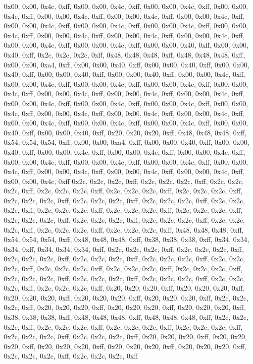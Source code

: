 0x00, 0x00, 0x4c, 0xff, 0x00, 0x00, 0x4c, 0xff, 0x00, 0x00, 0x4c, 0xff, 0x00, 0x00, 0x4c, 0xff, 0x00, 0x00, 0x4c, 0xff, 0x00, 0x00, 0x4c, 0xff, 0x00, 0x00, 0x4c, 0xff, 0x00, 0x00, 0x4c, 0xff, 0x00, 0x00, 0x4c, 0xff, 0x00, 0x00, 0x4c, 0xff, 0x00, 0x00, 0x4c, 0xff, 0x00, 0x00, 0x4c, 0xff, 0x00, 0x00, 0x4c, 0xff, 0x00, 0x00, 0x4c, 0xff, 0x00, 0x00, 0x4c, 0xff, 0x00, 0x00, 0x4c, 0xff, 0x00, 0x00, 0x40, 0xff, 0x00, 0x00, 0x40, 0xff, 0x2c, 0x2c, 0x2c, 0xff, 0x48, 0x48, 0x48, 0xff, 0x48, 0x48, 0x48, 0xff, 0x00, 0x00, 0xa4, 0xff, 0x00, 0x00, 0x40, 0xff, 0x00, 0x00, 0x40, 0xff, 0x00, 0x00, 0x40, 0xff, 0x00, 0x00, 0x40, 0xff, 0x00, 0x00, 0x40, 0xff, 0x00, 0x00, 0x4c, 0xff, 0x00, 0x00, 0x4c, 0xff, 0x00, 0x00, 0x4c, 0xff, 0x00, 0x00, 0x4c, 0xff, 0x00, 0x00, 0x4c, 0xff, 0x00, 0x00, 0x4c, 0xff, 0x00, 0x00, 0x4c, 0xff, 0x00, 0x00, 0x4c, 0xff, 0x00, 0x00, 0x4c, 0xff, 0x00, 0x00, 0x4c, 0xff, 0x00, 0x00, 0x4c, 0xff, 0x00, 0x00, 0x4c, 0xff, 0x00, 0x00, 0x4c, 0xff, 0x00, 0x00, 0x4c, 0xff, 0x00, 0x00, 0x4c, 0xff, 0x00, 0x00, 0x4c, 0xff, 0x00, 0x00, 0x4c, 0xff, 0x00, 0x00, 0x4c, 0xff, 0x00, 0x00, 0x40, 0xff, 0x00, 0x00, 0x40, 0xff, 0x20, 0x20, 0x20, 0xff, 0x48, 0x48, 0x48, 0xff, 0x54, 0x54, 0x54, 0xff, 0x00, 0x00, 0xa4, 0xff, 0x00, 0x00, 0x40, 0xff, 0x00, 0x00, 0x40, 0xff, 0x00, 0x00, 0x4c, 0xff, 0x00, 0x00, 0x4c, 0xff, 0x00, 0x00, 0x4c, 0xff, 0x00, 0x00, 0x4c, 0xff, 0x00, 0x00, 0x4c, 0xff, 0x00, 0x00, 0x4c, 0xff, 0x00, 0x00, 0x4c, 0xff, 0x00, 0x00, 0x4c, 0xff, 0x00, 0x00, 0x4c, 0xff, 0x00, 0x00, 0x4c, 0xff, 0x00, 0x00, 0x4c, 0xff
0x2c, 0x2c, 0x2c, 0xff, 0x2c, 0x2c, 0x2c, 0xff, 0x2c, 0x2c, 0x2c, 0xff, 0x2c, 0x2c, 0x2c, 0xff, 0x2c, 0x2c, 0x2c, 0xff, 0x2c, 0x2c, 0x2c, 0xff, 0x2c, 0x2c, 0x2c, 0xff, 0x2c, 0x2c, 0x2c, 0xff, 0x2c, 0x2c, 0x2c, 0xff, 0x2c, 0x2c, 0x2c, 0xff, 0x2c, 0x2c, 0x2c, 0xff, 0x2c, 0x2c, 0x2c, 0xff, 0x2c, 0x2c, 0x2c, 0xff, 0x2c, 0x2c, 0x2c, 0xff, 0x2c, 0x2c, 0x2c, 0xff, 0x2c, 0x2c, 0x2c, 0xff, 0x2c, 0x2c, 0x2c, 0xff, 0x2c, 0x2c, 0x2c, 0xff, 0x2c, 0x2c, 0x2c, 0xff, 0x48, 0x48, 0x48, 0xff, 0x54, 0x54, 0x54, 0xff, 0x48, 0x48, 0x48, 0xff, 0x38, 0x38, 0x38, 0xff, 0x34, 0x34, 0x34, 0xff, 0x34, 0x34, 0x34, 0xff, 0x2c, 0x2c, 0x2c, 0xff, 0x2c, 0x2c, 0x2c, 0xff, 0x2c, 0x2c, 0x2c, 0xff, 0x2c, 0x2c, 0x2c, 0xff, 0x2c, 0x2c, 0x2c, 0xff, 0x2c, 0x2c, 0x2c, 0xff, 0x2c, 0x2c, 0x2c, 0xff, 0x2c, 0x2c, 0x2c, 0xff, 0x2c, 0x2c, 0x2c, 0xff, 0x2c, 0x2c, 0x2c, 0xff, 0x2c, 0x2c, 0x2c, 0xff, 0x2c, 0x2c, 0x2c, 0xff, 0x2c, 0x2c, 0x2c, 0xff, 0x2c, 0x2c, 0x2c, 0xff, 0x20, 0x20, 0x20, 0xff, 0x20, 0x20, 0x20, 0xff, 0x20, 0x20, 0x20, 0xff, 0x20, 0x20, 0x20, 0xff, 0x20, 0x20, 0x20, 0xff, 0x2c, 0x2c, 0x2c, 0xff, 0x20, 0x20, 0x20, 0xff, 0x20, 0x20, 0x20, 0xff, 0x20, 0x20, 0x20, 0xff, 0x38, 0x38, 0x38, 0xff, 0x48, 0x48, 0x48, 0xff, 0x48, 0x48, 0x48, 0xff, 0x2c, 0x2c, 0x2c, 0xff, 0x2c, 0x2c, 0x2c, 0xff, 0x2c, 0x2c, 0x2c, 0xff, 0x2c, 0x2c, 0x2c, 0xff, 0x2c, 0x2c, 0x2c, 0xff, 0x2c, 0x2c, 0x2c, 0xff, 0x20, 0x20, 0x20, 0xff, 0x20, 0x20, 0x20, 0xff, 0x20, 0x20, 0x20, 0xff, 0x20, 0x20, 0x20, 0xff, 0x20, 0x20, 0x20, 0xff, 0x2c, 0x2c, 0x2c, 0xff, 0x2c, 0x2c, 0x2c, 0xff
